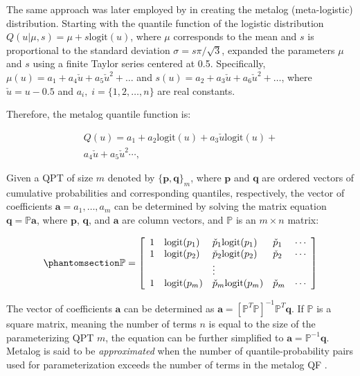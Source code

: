 \documentclass[
  fleqn,
  deca,
  blindrev
]{informs4}
\begin{document}
The same approach was later employed by
\citep{keelin2016MetalogDistributions} in creating the metalog
(meta-logistic) distribution. Starting with the quantile function of the
logistic distribution \(Q(u\vert\mu,s)=\mu+s\text{logit}(u)\), where
\(\mu\) corresponds to the mean and \(s\) is proportional to the
standard deviation \(\sigma=s\pi/\sqrt3\),
\citep{keelin2016MetalogDistributions} expanded the parameters \(\mu\)
and \(s\) using a finite Taylor series centered at 0.5. Specifically,
\(\mu(u)=a_1+a_4\check{u}+a_5\check{u}^2+\dots\) and
\(s(u)=a_2+a_3\check{u}+a_6\check{u}^2+\dots\), where
\(\check{u}=u-0.5\) and \(a_i, \; i = \{1,2,\dots,n\}\) are real
constants.

Therefore, the metalog quantile function is:

\[
\begin{gathered}
Q(u)= a_1+a_2\text{logit}(u)+a_3\check{u}\text{logit}(u)+\\
a_4\check{u}+a_5\check{u}^2\cdots,
\end{gathered}
\]

Given a QPT of size \(m\) denoted by \(\{\mathbf{p}, \mathbf{q}\}_m\),
where \(\mathbf{p}\) and \(\mathbf{q}\) are ordered vectors of
cumulative probabilities and corresponding quantiles, respectively, the
vector of coefficients \(\mathbf{a}={a_1,\dots,a_m}\) can be determined
by solving the matrix equation \(\mathbf{q}=\mathbb{P}\mathbf{a}\),
where \(\mathbf{p}\), \(\mathbf{q}\), and \(\mathbf{a}\) are column
vectors, and \(\mathbb{P}\) is an \(m \times n\) matrix:

\begin{equation}\phantomsection\label{eq-metalogPMatrixeq}{
\begin{gathered}
\mathbb{P} = \left[\begin{array}{lllll}
1  &\text{logit}(p_1) &\check{p}_1\text{logit}(p_1) &\check{p}_1 &\cdots\\
1  &\text{logit}(p_2) &\check{p}_2\text{logit}(p_2) &\check{p}_2 &\cdots\\
   &                  &\vdots\\
1  &\text{logit}(p_m) &\check{p}_m\text{logit}(p_m) &\check{p}_m &\cdots
\end{array}\right]
\end{gathered}
}\end{equation}

The vector of coefficients \(\mathbf{a}\) can be determined as
\(\mathbf{a}=[\mathbb{P}^{T}\mathbb{P}]^{-1}\mathbb{P}^{T}\mathbf{q}\).
If \(\mathbb{P}\) is a square matrix, meaning the number of terms \(n\)
is equal to the size of the parameterizing QPT \(m\), the equation can
be further simplified to \(\mathbf{a}=\mathbb{P}^{-1}\mathbf{q}\).
Metalog is said to be \emph{approximated} when the number of
quantile-probability pairs used for parameterization exceeds the number
of terms in the metalog QF
\citep{keelin2016MetalogDistributions, perepolkin2021HybridElicitationIndirect}.
\end{document}
